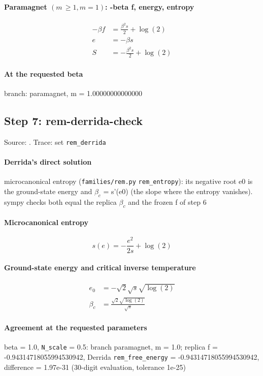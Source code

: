 \documentclass[11pt]{article}
\begin{document}
\paragraph{Paramagnet $(m\,\geq  1, m = 1)$: -beta f, energy, entropy}
\begin{align}
- \beta f &= \frac{\beta^{2} s}{2} + \log{\left(2 \right)} \\
e &= - \beta s \\
S &= - \frac{\beta^{2} s}{2} + \log{\left(2 \right)}
\end{align}
\paragraph{At the requested beta}
branch: paramagnet, m = 1.00000000000000
\subsection{Step 7: rem-derrida-check}
Source: \cite{b3,b1,b2}. Trace: set \texttt{rem\_derrida}

\paragraph{Derrida's direct solution}
microcanonical entropy (\texttt{families/rem.py} \texttt{rem\_entropy}): its negative root e0 is the ground-state energy and $\beta _{c}$ = s'(e0) (the slope where the entropy vanishes).  sympy checks both equal the replica $\beta _{c}$ and the frozen f of step 6
\paragraph{Microcanonical entropy}
\begin{equation}
s{\left(e \right)} = - \frac{e^{2}}{2 s} + \log{\left(2 \right)}
\end{equation}
\paragraph{Ground-state energy and critical inverse temperature}
\begin{align}
e_{0} &= - \sqrt{2} \sqrt{s} \sqrt{\log{\left(2 \right)}} \\
\beta_{c} &= \frac{\sqrt{2} \sqrt{\log{\left(2 \right)}}}{\sqrt{s}}
\end{align}
\paragraph{Agreement at the requested parameters}
beta = 1.0, \texttt{N\_scale} = 0.5: branch paramagnet, m = 1.0; replica f = -0.94314718055994530942, Derrida \texttt{rem\_free\_energy} = -0.94314718055994530942, \textbar{}difference\textbar{} = 1.97e-31 (30-digit evaluation, tolerance 1e-25)
\end{document}
